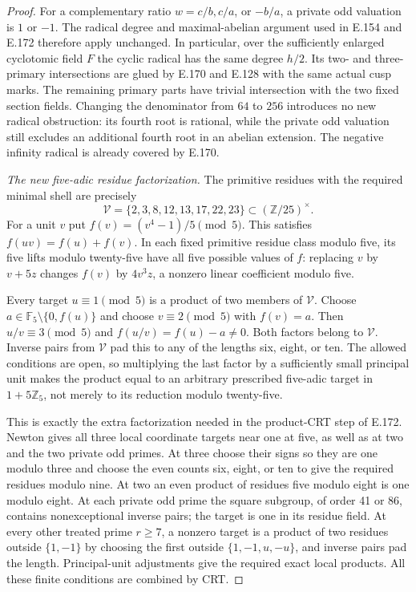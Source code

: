 \begin{proof}
For a complementary ratio $w=c/b,c/a$, or $-b/a$, a private odd
valuation is $1$ or $-1$. The radical degree and maximal-abelian
argument used in E.154 and E.172 therefore apply unchanged. In
particular, over the sufficiently enlarged cyclotomic field $F$ the
cyclic radical has the same degree $h/2$. Its two- and three-primary
intersections are glued by E.170 and E.128 with the same actual cusp
marks. The remaining primary parts have trivial intersection with the
two fixed section fields. Changing the denominator from $64$ to $256$
introduces no new radical obstruction: its fourth root is rational,
while the private odd valuation still excludes an additional fourth
root in an abelian extension. The negative infinity radical is already
covered by E.170.

\emph{The new five-adic residue factorization.}
The primitive residues with the required minimal shell are precisely
\[
                 \mathcal V=\{2,3,8,12,13,17,22,23\}
                    \subset(\mathbb Z/25)^\times.
 \tag{E.215.8}
\]
For a unit $v$ put $f(v)=(v^4-1)/5\pmod5$. This satisfies
$f(uv)=f(u)+f(v)$. In each fixed primitive residue class modulo five,
its five lifts modulo twenty-five have all five possible values of
$f$: replacing $v$ by $v+5z$ changes $f(v)$ by $4v^3z$, a nonzero
linear coefficient modulo five.

Every target $u\equiv1\pmod5$ is a product of two members of
$\mathcal V$. Choose $a\in\mathbb F_5\setminus\{0,f(u)\}$ and choose
$v\equiv2\pmod5$ with $f(v)=a$. Then $u/v\equiv3\pmod5$ and
$f(u/v)=f(u)-a\ne0$. Both factors belong to $\mathcal V$. Inverse
pairs from $\mathcal V$ pad this to any of the lengths six, eight, or
ten. The allowed conditions are open, so multiplying the last factor
by a sufficiently small principal unit makes the product equal to an
arbitrary prescribed five-adic target in $1+5\mathbb Z_5$, not merely
to its reduction modulo twenty-five.

This is exactly the extra factorization needed in the product-CRT step
of E.172. Newton gives all three local coordinate targets near one at
five, as well as at two and the two private odd primes. At three choose
their signs so they are one modulo three and choose the even counts
six, eight, or ten to give the required residues modulo nine. At two
an even product of residues five modulo eight is one modulo eight.
At each private odd prime the square subgroup, of order 41 or 86,
contains nonexceptional inverse pairs; the target is one in its residue
field. At every other treated prime $r\ge7$, a nonzero target is a
product of two residues outside $\{1,-1\}$ by choosing the first
outside $\{1,-1,u,-u\}$, and inverse pairs pad the length. Principal-unit
adjustments give the required exact local products. All these finite
conditions are combined by CRT.


\end{proof}
